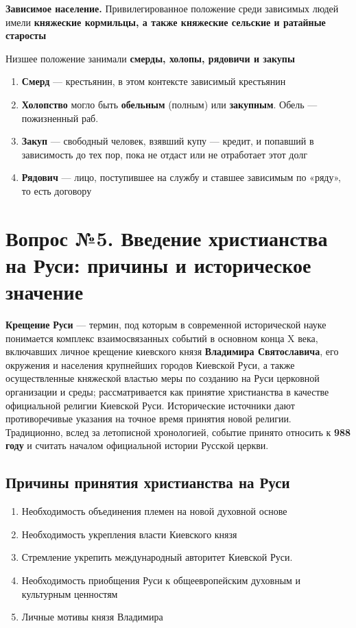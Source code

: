 \documentclass{article}
\begin{document}
\hfill

\textbf{Зависимое население.} Привилегированное положение среди зависимых людей имели \textbf{княжеские кормильцы, а также княжеские сельские и ратайные старосты}

Низшее положение занимали \textbf{смерды, холопы, рядовичи и закупы}

\begin{enumerate}
    \item \textbf{Смерд} — крестьянин, в этом контексте зависимый крестьянин
    \item \textbf{Холопство} могло быть \textbf{обельным} (полным) или \textbf{закупным}. Обель — пожизненный раб.
    \item \textbf{Закуп} — свободный человек, взявший купу — кредит, и попавший в зависимость до тех пор, пока не отдаст или не отработает этот долг
    \item \textbf{Рядович} — лицо, поступившее на службу и ставшее зависимым по «ряду», то есть договору
\end{enumerate}

\pagebreak
\section{Вопрос №5. Введение христианства на Руси: причины и историческое значение}

\textbf{Крещение} \textbf{Руси} — термин, под которым в современной исторической науке понимается комплекс взаимосвязанных событий в основном конца X века, включавших личное крещение киевского князя \textbf{Владимира Святославича}, его окружения и населения крупнейших городов Киевской Руси, а также осуществленные княжеской властью меры по созданию на Руси церковной организации и среды; рассматривается как принятие христианства в качестве официальной религии Киевской Руси. Исторические источники дают противоречивые указания на точное время принятия новой религии. Традиционно, вслед за летописной хронологией, событие принято относить к \textbf{988 году} и считать началом официальной истории Русской церкви.

\subsection{Причины принятия христианства на Руси}

\begin{enumerate}
    \item Необходимость объединения племен на новой духовной основе
    \item Необходимость укрепления власти Киевского князя 
    \item Стремление укрепить международный авторитет Киевской Руси.
    \item Необходимость приобщения Руси к общеевропейским духовным и культурным ценностям
    \item Личные мотивы князя Владимира
\end{enumerate}
\end{document}
